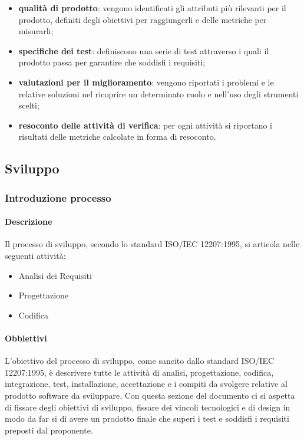 \begin{itemize}
\begin{itemize}
                            \item\textbf{qualità di prodotto}: vengono identificati gli attributi più rilevanti per il prodotto, definiti degli obiettivi per raggiungerli e delle metriche per misurarli;
                            \item\textbf{specifiche dei test}: definiscono una serie di test attraverso i quali il prodotto passa per garantire che soddisfi i requisiti;
                            \item\textbf{valutazioni per il miglioramento}: vengono riportati i problemi e le relative soluzioni nel ricoprire un determinato ruolo e nell'uso degli strumenti scelti;
                            \item\textbf{resoconto delle attività di verifica}: per ogni attività si riportano i risultati delle metriche calcolate in forma di resoconto.
                        \end{itemize}
                \end{itemize}
    \subsection{Sviluppo}
        \subsubsection{Introduzione processo}
            \paragraph{Descrizione}
                Il processo di sviluppo, secondo lo standard ISO/IEC 12207:1995, si articola nelle seguenti attività:\\
                \begin{itemize}
                    \item Analisi dei Requisiti
                    \item Progettazione
                    \item Codifica
                \end{itemize}
            \paragraph{Obbiettivi}
                L'obiettivo del processo di sviluppo, come sancito dallo standard ISO/IEC 12207:1995, è descrivere tutte le attività di analisi, progettazione, codifica, integrazione, test, installazione, accettazione e i compiti da svolgere relative al prodotto software da sviluppare. Con questa sezione del documento ci si aspetta di fissare degli obiettivi di sviluppo, fissare dei vincoli tecnologici e di design in modo da far si di avere un prodotto finale che superi i test e soddisfi i requisiti preposti dal proponente.\\

